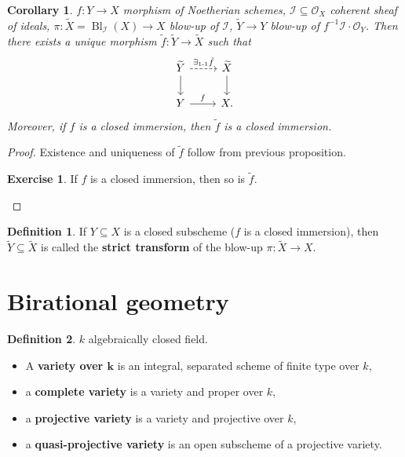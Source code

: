 \documentclass[12pt]{article}
\DeclareMathOperator{\Bl}{Bl}
\newtheorem*{corollary}{Corollary}
\theoremstyle{definition}
\newtheorem*{definition}{Definition}
\newtheorem*{exercise}{Exercise}
\theoremstyle{remark}
\begin{document}
\begin{corollary}
$f:Y\rightarrow X$ morphism of Noetherian schemes, $\mathcal{I}\subseteq\mathcal{O}_X$ coherent sheaf of ideals, $\pi:\widetilde{X}=\Bl_{\mathcal{I}}(X)\rightarrow X$ blow-up of $\mathcal{I}$, $\widetilde{Y}\rightarrow Y$ blow-up of $f^{-1}\mathcal{I}\cdot\mathcal{O}_Y$. Then there exists a unique morphism $\tilde{f}:\widetilde{Y}\rightarrow\widetilde{X}$ such that
\[
\begin{tikzcd}
\widetilde{Y}\arrow[r,dashed,"\exists_{1\text{-}1}\tilde{f}"]\arrow[d]&\widetilde{X}\arrow[d]\\
Y\arrow[r,"f"]&X.
\end{tikzcd}
\]
Moreover, if $f$ is a closed immersion, then $\tilde{f}$ is a closed immersion.
\end{corollary}

\begin{proof}
Existence and uniqueness of $\tilde{f}$ follow from previous proposition.

\begin{exercise}
If $f$ is a closed immersion, then so is $\tilde{f}$.
\end{exercise}
\end{proof}

\begin{definition}
If $Y\subseteq X$ is a closed subscheme ($f$ is a closed immersion), then $\widetilde{Y}\subseteq\widetilde{X}$ is called the \textbf{strict transform} of the blow-up $\pi:\widetilde{X}\rightarrow X$.
\end{definition}

\section{Birational geometry}
\begin{definition}
$k$ algebraically closed field.
\begin{itemize}
\item A \textbf{variety over $\boldsymbol{k}$} is an integral, separated scheme of finite type over $k$,
\item a \textbf{complete variety} is a variety and proper over $k$,
\item a \textbf{projective variety} is a variety and projective over $k$,
\item a \textbf{quasi-projective variety} is an open subscheme of a projective variety.
\end{itemize}
\end{definition}
\end{document}
